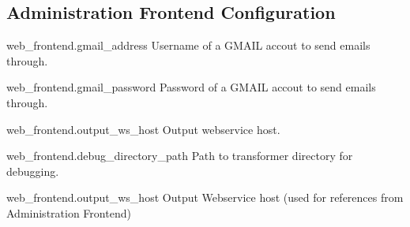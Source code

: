 \subsection*{Administration Frontend Configuration}
\begin{configlist}
	
	\item[web\_frontend.gmail\_address]
		Username of a GMAIL accout to send emails through.
		
	\item[web\_frontend.gmail\_password]
		Password of a GMAIL accout to send emails through.
		
	\item[web\_frontend.output\_ws\_host]
		Output webservice host.
		
	\item[web\_frontend.debug\_directory\_path]
		Path to transformer directory for debugging.
	\item[web\_frontend.output\_ws\_host]
		Output Webservice host (used for references from Administration Frontend)
\end{configlist}

